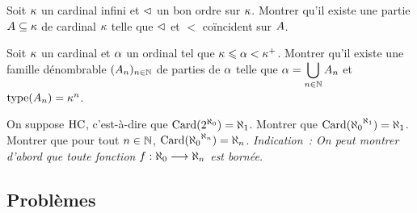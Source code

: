\begin{exercise}
  Soit $\kappa$ un cardinal infini et $\mathrel{\lhd}$ un bon ordre sur $\kappa$.
  Montrer qu'il existe une partie $A\subseteq\kappa$ de cardinal $\kappa$
  telle que $\mathrel{\lhd}$ et $<$ coïncident sur $A$.
\end{exercise}

\begin{exercise}
  Soit $\kappa$ un cardinal et $\alpha$ un ordinal tel que
  $\kappa \leqslant \alpha < \kappa^{+}$. Montrer qu'il existe une famille
  dénombrable $(A_n)_{n\in \mathbb N}$ de parties de $\alpha$ telle que
  $\displaystyle\alpha = \bigcup_{n\in \mathbb N} A_n$ et
  $\operatorname{type}(A_n) = \kappa^n$.
\end{exercise}

\begin{exercise}
  On suppose $\operatorname{HC}$, c'est-à-dire que $\operatorname{Card}(2^{\aleph_0}) = \aleph_1$. Montrer que
  $\operatorname{Card}({\aleph_0}^{\aleph_1}) = \aleph_1$. Montrer que pour tout $n \in \mathbb N$,
  $\operatorname{Card}({\aleph_0}^{\aleph_n}) = \aleph_n$. \textit{Indication~: On peut montrer
  d'abord que toute fonction $f : \displaystyle \aleph_0 \longrightarrow \aleph_n$ est bornée.}
\end{exercise}

\clearpage

\subsection{Problèmes}

